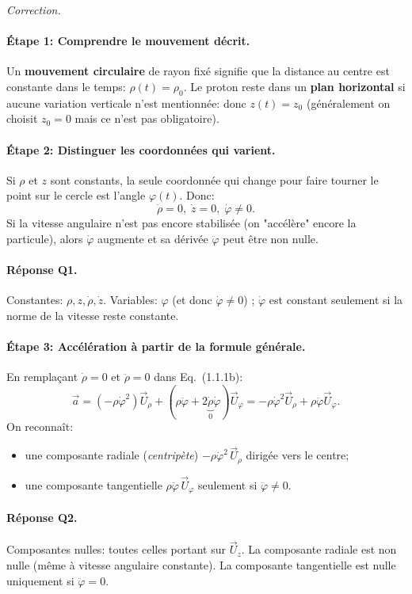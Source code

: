 \documentclass[11pt,a4paper]{article}
\newenvironment{correction}{
    \par\begingroup
    \color{blue!60!black}
    \smallskip\noindent\textit{Correction.}\quad
}{\par\medskip\endgroup}
\begin{document}
\begin{correction}
\paragraph{Étape 1: Comprendre le mouvement décrit.} Un \textbf{mouvement circulaire} de rayon fixé signifie que la distance au centre est constante dans le temps: $\rho(t)=\rho_0$. Le proton reste dans un \textbf{plan horizontal} si aucune variation verticale n'est mentionnée: donc $z(t)=z_0$ (généralement on choisit $z_0=0$ mais ce n'est pas obligatoire).

\paragraph{Étape 2: Distinguer les coordonnées qui varient.} Si $\rho$ et $z$ sont constants, la seule coordonnée qui change pour faire tourner le point sur le cercle est l'angle $\varphi(t)$. Donc:
\[
\dot\rho=0,\; \dot z=0,\; \dot\varphi \neq 0.\]
Si la vitesse angulaire n'est pas encore stabilisée (on "accélère" encore la particule), alors $\dot\varphi$ augmente et sa dérivée $\ddot\varphi$ peut être non nulle.

\paragraph{Réponse Q1.} Constantes: $\rho, z, \dot\rho, \dot z$. Variables: $\varphi$ (et donc $\dot\varphi \neq 0$) ; $\dot\varphi$ est constant seulement si la norme de la vitesse reste constante.

\paragraph{Étape 3: Accélération à partir de la formule générale.} En remplaçant $\dot\rho=0$ et $\ddot\rho=0$ dans Eq.~(1.1.1b):
\[
\vec a = ( - \rho \dot\varphi^{2}) \vec U_{\rho} + (\rho \ddot\varphi + 2\underbrace{\dot\rho}_{0}\dot\varphi) \vec U_{\varphi} = -\rho \dot\varphi^{2} \vec U_{\rho} + \rho \ddot\varphi \vec U_{\varphi}.
\]
On reconnaît:
\begin{itemize}
  \item une composante radiale (\textit{centripète}) $-\rho \dot\varphi^2\,\vec U_{\rho}$ dirigée vers le centre;
  \item une composante tangentielle $\rho\ddot\varphi\,\vec U_{\varphi}$ seulement si $\ddot\varphi \neq 0$.
\end{itemize}
\paragraph{Réponse Q2.} Composantes nulles: toutes celles portant sur $\vec U_z$. La composante radiale est non nulle (même à vitesse angulaire constante). La composante tangentielle est nulle uniquement si $\ddot\varphi=0$.


\end{correction}
\end{document}
